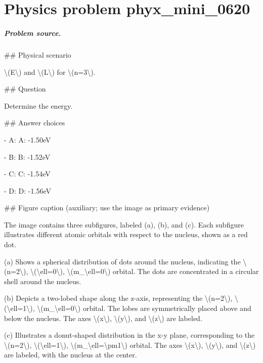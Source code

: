 
\chapter{Physics problem phyx\_mini\_0620}
\label{ch:PhyXMiniProblems_problem_phyx_mini_0620}

\paragraph{Problem source.}
\#\# Physical scenario

\textbackslash{}(E\textbackslash{}) and \textbackslash{}(L\textbackslash{}) for \textbackslash{}(n=3\textbackslash{}).

\#\# Question

Determine the energy.

\#\# Answer choices

- A: A: -1.50eV

- B: B: -1.52eV

- C: C: -1.54eV

- D: D: -1.56eV

\#\# Figure caption (auxiliary; use the image as primary evidence)

The image contains three subfigures, labeled (a), (b), and (c). Each subfigure illustrates different atomic orbitals with respect to the nucleus, shown as a red dot.

(a) Shows a spherical distribution of dots around the nucleus, indicating the \textbackslash{}(n=2\textbackslash{}), \textbackslash{}(\textbackslash{}ell=0\textbackslash{}), \textbackslash{}(m\_\textbackslash{}ell=0\textbackslash{}) orbital. The dots are concentrated in a circular shell around the nucleus.

(b) Depicts a two-lobed shape along the z-axis, representing the \textbackslash{}(n=2\textbackslash{}), \textbackslash{}(\textbackslash{}ell=1\textbackslash{}), \textbackslash{}(m\_\textbackslash{}ell=0\textbackslash{}) orbital. The lobes are symmetrically placed above and below the nucleus. The axes \textbackslash{}(x\textbackslash{}), \textbackslash{}(y\textbackslash{}), and \textbackslash{}(z\textbackslash{}) are labeled.

(c) Illustrates a donut-shaped distribution in the x-y plane, corresponding to the \textbackslash{}(n=2\textbackslash{}), \textbackslash{}(\textbackslash{}ell=1\textbackslash{}), \textbackslash{}(m\_\textbackslash{}ell=\textbackslash{}pm1\textbackslash{}) orbital. The axes \textbackslash{}(x\textbackslash{}), \textbackslash{}(y\textbackslash{}), and \textbackslash{}(z\textbackslash{}) are labeled, with the nucleus at the center.

